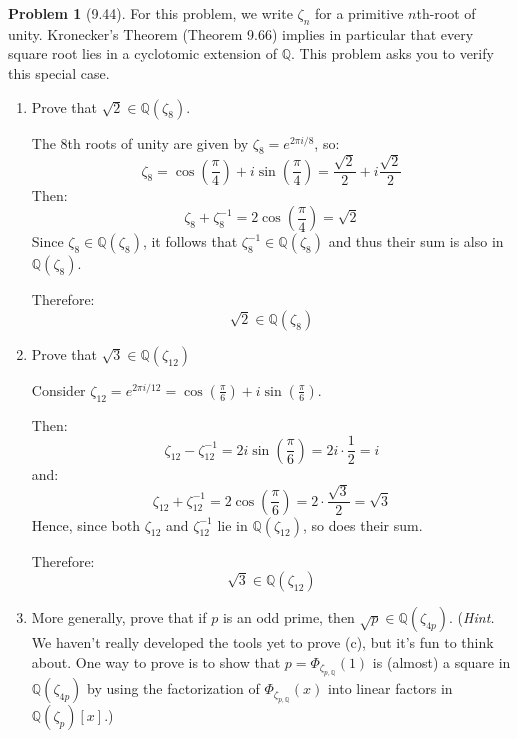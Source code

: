 \documentclass[12pt]{article}
\theoremstyle{definition}
\newtheorem{problem}{Problem}
\begin{document}
\begin{problem}[9.44]
    For this problem, we write $\zeta_n$ for a primitive $n$th-root of unity. Kronecker's Theorem (Theorem 9.66) implies in particular
    that every square root lies in a cyclotomic extension of $\mathbb{Q}$. This problem asks you to verify this special case.
    \begin{enumerate}[label=(\alph*)]
        \item Prove that $\sqrt{2} \in \mathbb{Q}(\zeta_8)$. 
        
        \begin{solution}
            The $8$th roots of unity are given by $\zeta_8 = e^{2\pi i / 8}$, so:
            \[
                \zeta_8 = \cos\left( \frac{\pi}{4} \right) + i \sin\left( \frac{\pi}{4} \right) = \frac{\sqrt{2}}{2} + i \frac{\sqrt{2}}{2}
            \]
            Then:
            \[
                \zeta_8 + \zeta_8^{-1} = 2 \cos\left( \frac{\pi}{4} \right) = \sqrt{2}
            \]
            Since $\zeta_8 \in \mathbb{Q}(\zeta_8)$, it follows that $\zeta_8^{-1} \in \mathbb{Q}(\zeta_8)$ and thus their sum is also in $\mathbb{Q}(\zeta_8)$.

            Therefore:
            \[
                \sqrt{2} \in \mathbb{Q}(\zeta_8)
            \]
        \end{solution}

        \item Prove that $\sqrt{3} \in \mathbb{Q}(\zeta_{12})$
        
        \begin{solution}
            Consider $\zeta_{12} = e^{2\pi i / 12} = \cos\left( \frac{\pi}{6} \right) + i \sin\left( \frac{\pi}{6} \right)$.

            Then:
            \[
                \zeta_{12} - \zeta_{12}^{-1} = 2i \sin\left( \frac{\pi}{6} \right) = 2i \cdot \frac{1}{2} = i
            \]
            and:
            \[
                \zeta_{12} + \zeta_{12}^{-1} = 2 \cos\left( \frac{\pi}{6} \right) = 2 \cdot \frac{\sqrt{3}}{2} = \sqrt{3}
            \]
            Hence, since both $\zeta_{12}$ and $\zeta_{12}^{-1}$ lie in $\mathbb{Q}(\zeta_{12})$, so does their sum.

            Therefore:
            \[
                \sqrt{3} \in \mathbb{Q}(\zeta_{12})
            \]
        \end{solution}

        \item More generally, prove that if $p$ is an odd prime, then $\sqrt{p} \in \mathbb{Q}(\zeta_{4p})$.
        (\textit{Hint.} We haven't really developed the tools yet to prove (c), but it's fun to think about.
        One way to prove is to show that $p = \Phi_{\zeta_{p, \mathbb{Q}}}(1)$ is (almost) a square in $\mathbb{Q}(\zeta_{4p})$
        by using the factorization of $\Phi_{\zeta_{p, \mathbb{Q}}}(x)$ into linear factors in $\mathbb{Q}(\zeta_p)[x]$.)
        

\end{enumerate}
\end{problem}
\end{document}
